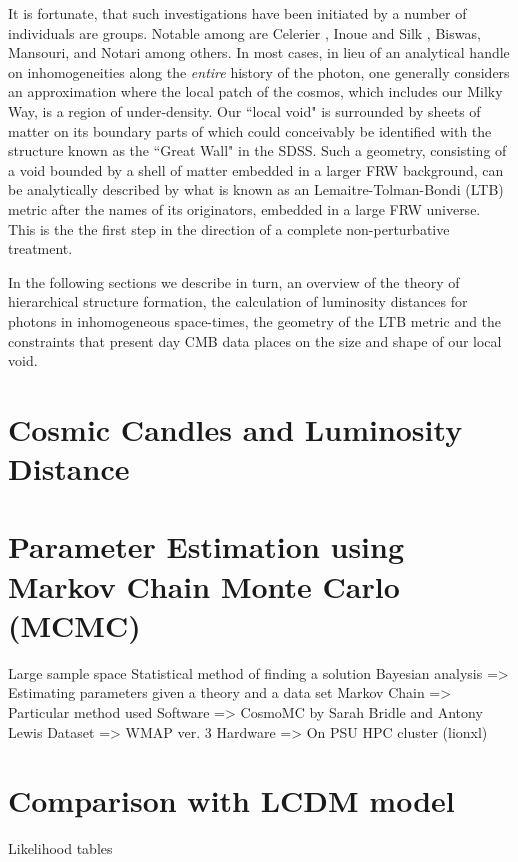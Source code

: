 It is fortunate, that such investigations have been initiated by a number of individuals are groups. Notable among are Celerier \cite{Celerier2007Do}, Inoue and Silk \cite{Inoue2006Local,Inoue2007Local}, Biswas, Mansouri, and Notari \cite{Biswas2006Nonlinear} among others. In most cases, in lieu of an analytical handle on inhomogeneities along the \emph{entire} history of the photon, one generally considers an approximation where the local patch of the cosmos, which includes our Milky Way, is a region of under-density. Our ``local void" is surrounded by sheets of matter on its boundary parts of which could conceivably be identified with the structure known as the ``Great Wall" in the SDSS. Such a geometry, consisting of a void bounded by a shell of matter embedded in a larger FRW background, can be analytically described by what is known as an Lemaitre-Tolman-Bondi (LTB) metric after the names of its originators, embedded in a large FRW universe. This is the the first step in the direction of a complete non-perturbative treatment.

In the following sections we describe in turn, an overview of the theory of hierarchical structure formation, the calculation of luminosity distances for photons in inhomogeneous space-times, the geometry of the LTB metric and the constraints that present day CMB data places on the size and shape of our local void.

\section{Cosmic Candles and Luminosity Distance}


\section{Parameter Estimation using Markov Chain Monte Carlo (MCMC)}

Large sample space
Statistical method of finding a solution
Bayesian analysis => Estimating parameters given a theory and a data set
Markov Chain => Particular method used
Software => CosmoMC by Sarah Bridle and Antony Lewis
Dataset => WMAP ver. 3
Hardware => On PSU HPC cluster (lionxl)

\section{Comparison with LCDM model}

Likelihood tables

\appendix

